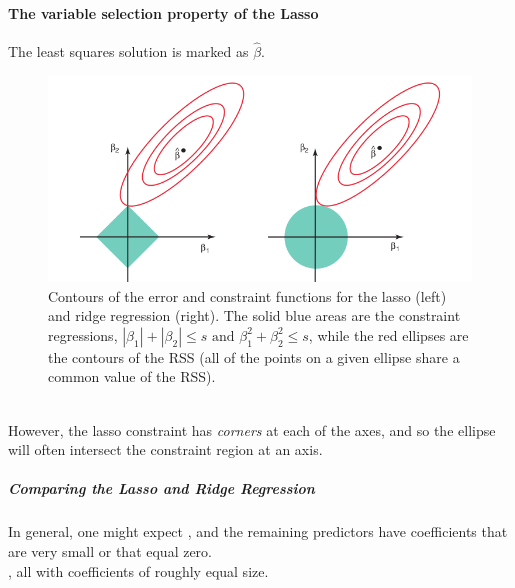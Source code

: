\paragraph{The variable selection property of the Lasso}
The least squares solution is marked as $\hat{\beta}$.
\begin{figure}[H]
	\begin{center}
		\includegraphics[width=\textwidth]{./chap/1chap/5sec/images/1RSSelipses.png}
	\end{center}
	\caption{Contours of the error and constraint functions for the
	lasso (left) and ridge regression (right). The solid blue areas
	are the constraint regressions, $|\beta_{1}|+|\beta_{2}|\leq 
	s\text{ and }\beta_{1}^{2}+\beta_{2}^{2}\leq s$, while the red
	ellipses are the contours of the RSS (all of the points on a
	given ellipse share a common value of the RSS).}
	\label{fig:5.1 RSSelipses}
\end{figure}

\\
However, the lasso constraint has \emph{corners} at each of the axes, 
and so the ellipse will often intersect the constraint region at an 
axis.

\subparagraph{Comparing the Lasso and Ridge Regression}
In general, one might expect , and the remaining predictors have 
coefficients that are very small or that equal zero.\\
, all with coefficients of roughly equal 
size.\\

